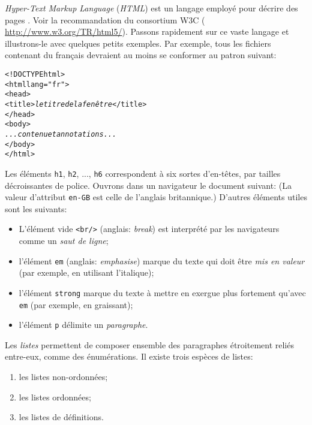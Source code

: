 \emph{Hyper-Text Markup Language} (\emph{\textsf{HTML}}) est un
langage employé pour décrire des pages \HTML. Voir la recommandation
du consortium W3C ({\small
  \url{http://www.w3.org/TR/html5/}}). Passons rapidement sur ce vaste
langage et illustrons-le avec quelques petits exemples. Par exemple,
tous les fichiers \HTML contenant du français devraient au moins se
conformer au patron suivant:
\begin{alltt}
\small<!DOCTYPE html>
<html lang="fr">
  <head>
    <title>\textit{le titre de la fenêtre}</title>
  </head>
  <body>
     \emph{...contenu et annotations...}
  </body>
</html>
\end{alltt}
Les éléments \texttt{h1}, \texttt{h2}, ..., \texttt{h6} correspondent
à six sortes d'en-têtes, par tailles décroissantes de police. Ouvrons
dans un navigateur le document suivant: 
\noindent (La valeur d'attribut \texttt{en-GB} est celle de l'anglais
britannique.) D'autres éléments utiles sont les suivants:
\begin{itemize}

  \item L'élément vide \texttt{<br/>} (anglais: \emph{break}) est
  interprété par les navigateurs comme un \emph{saut de ligne};

  \item l'élément \texttt{em} (anglais: \emph{emphasise}) marque du
  texte qui doit être \emph{mis en valeur} (par exemple, en utilisant
  l'italique);

  \item l'élément \texttt{strong} marque du texte à mettre en exergue
    plus fortement qu'avec \texttt{em} (par exemple, en graissant);

  \item l'élément \texttt{p} délimite un \emph{paragraphe}.

\end{itemize}
Les \emph{listes} permettent de composer ensemble des paragraphes
étroitement reliés entre-eux, comme des énumérations. Il existe trois
espèces de listes:
\begin{enumerate}

  \item les listes non-ordonnées;

  \item les listes ordonnées;

  \item les listes de définitions.

\end{enumerate}
